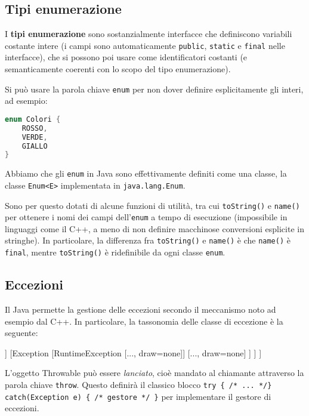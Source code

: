 \documentclass[a4paper,11pt]{article}
\begin{document}
\subsection{Tipi enumerazione}
I \textbf{tipi enumerazione} sono sostanzialmente interfacce che definiscono variabili costante intere (i campi sono automaticamente \lstinline|public|, \lstinline|static| e \lstinline|final| nelle interfacce), che si possono poi usare come identificatori costanti (e semanticamente coerenti con lo scopo del tipo enumerazione).

Si può usare la parola chiave \lstinline|enum| per non dover definire esplicitamente gli interi, ad esempio:
\begin{lstlisting}[language=java, style=codestyle]	
enum Colori {
	ROSSO,
	VERDE,
	GIALLO
}
\end{lstlisting}

Abbiamo che gli \lstinline|enum| in Java sono effettivamente definiti come una classe, la classe \lstinline|Enum<E>| implementata in \lstinline|java.lang.Enum|.

Sono per questo dotati di alcune funzioni di utilità, tra cui \lstinline|toString()| e \lstinline|name()| per ottenere i nomi dei campi dell'\lstinline|enum| a tempo di esecuzione (impossibile in linguaggi come il C++, a meno di non definire macchinose conversioni esplicite in stringhe).
In particolare, la differenza fra \lstinline|toString()| e \lstinline|name()| è che \lstinline|name()| è \lstinline|final|, mentre \lstinline|toString()| è ridefinibile da ogni classe \lstinline|enum|.

\subsection{Eccezioni}
Il Java permette la gestione delle eccezioni secondo il meccanismo noto ad esempio dal C++.
In particolare, la tassonomia delle classe di eccezione è la seguente:
\begin{center}
	\begin{forest}
		[Object, rectstyle
			[Throwable
				[Error
					[LinkageError]
					[..., draw=none]
					[VirtualMachineError]
				]
				[Exception
					[RuntimeException [..., draw=none]]
					[..., draw=none]
				]
			]
		]	
	\end{forest}
\end{center}

L'oggetto Throwable può essere \textit{lanciato}, cioè mandato al chiamante attraverso la parola chiave \lstinline|throw|.
Questo definirà il classico blocco \lstinline|try { /* ... */} catch(Exception e) { /* gestore */ }| per implementare il gestore di eccezioni.
\end{document}
